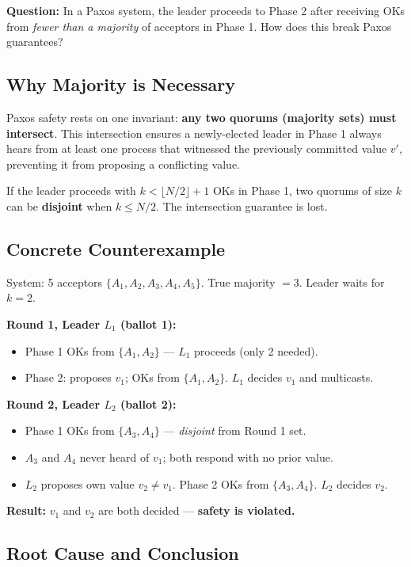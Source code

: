\documentclass[12pt,a4paper]{article}
\begin{document}
\textbf{Question:} In a Paxos system, the leader proceeds to Phase 2 after receiving OKs from \emph{fewer than a majority} of acceptors in Phase 1. How does this break Paxos guarantees?

\subsection*{Why Majority is Necessary}

Paxos safety rests on one invariant: \textbf{any two quorums (majority sets) must intersect}. This intersection ensures a newly-elected leader in Phase 1 always hears from at least one process that witnessed the previously committed value $v'$, preventing it from proposing a conflicting value.

If the leader proceeds with $k < \lfloor N/2\rfloor + 1$ OKs in Phase 1, two quorums of size $k$ can be \textbf{disjoint} when $k \leq N/2$. The intersection guarantee is lost.

\subsection*{Concrete Counterexample}

System: 5 acceptors $\{A_1, A_2, A_3, A_4, A_5\}$. True majority $= 3$. Leader waits for $k = 2$.

\medskip
\textbf{Round 1, Leader $L_1$ (ballot 1):}
\begin{itemize}[noitemsep]
  \item Phase 1 OKs from $\{A_1, A_2\}$ --- $L_1$ proceeds (only 2 needed).
  \item Phase 2: proposes $v_1$; OKs from $\{A_1, A_2\}$. $L_1$ decides $v_1$ and multicasts.
\end{itemize}

\textbf{Round 2, Leader $L_2$ (ballot 2):}
\begin{itemize}[noitemsep]
  \item Phase 1 OKs from $\{A_3, A_4\}$ --- \emph{disjoint} from Round 1 set.
  \item $A_3$ and $A_4$ never heard of $v_1$; both respond with no prior value.
  \item $L_2$ proposes own value $v_2 \neq v_1$. Phase 2 OKs from $\{A_3, A_4\}$. $L_2$ decides $v_2$.
\end{itemize}

\textbf{Result:} $v_1$ and $v_2$ are both decided --- \textbf{safety is violated.}

\subsection*{Root Cause and Conclusion}
\end{document}
